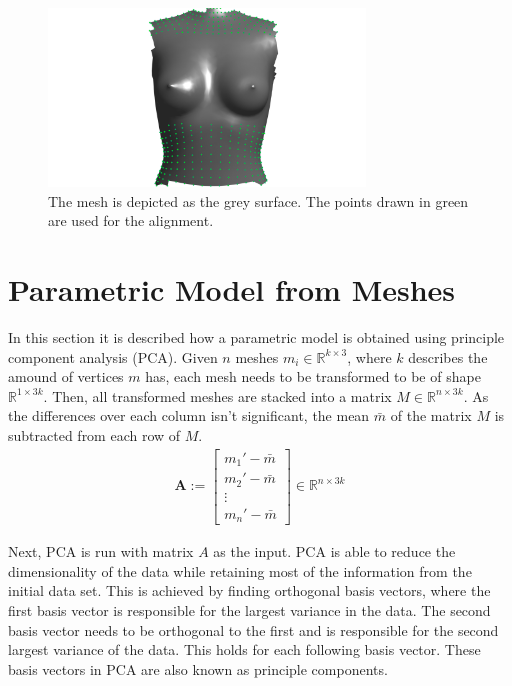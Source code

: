 \begin{figure}[h]
\centering
\includegraphics[width=0.75\textwidth]{figures/alignment}
\caption[Alignment points visualized]{The mesh is depicted as the grey surface. The points drawn in green are used for the alignment.}
\label{fig:alignment}
\end{figure}

\section{Parametric Model from Meshes}
\label{paramModel}
In this section it is described how a parametric model is obtained using principle component analysis (PCA). Given $n$ meshes $m_i \in \mathbb{R}^{k \times 3}$, where $k$ describes the amound of vertices $m$ has, each mesh needs to be transformed to be of shape $\mathbb{R}^{1 \times 3k}$. Then, all transformed meshes are stacked into a matrix $M \in \mathbb{R}^{n \times 3k}$. As the differences over each column isn't significant, the mean $\bar{m}$ of the matrix $M$ is subtracted from each row of $M$.
\begin{gather}
\mathbf{A} :=
\begin{bmatrix}
 m_1' - \bar{m} \\
 m_2' - \bar{m} \\
 \vdots \\
 m_n' - \bar{m}
\end{bmatrix}
\in \mathbb{R}^{n \times 3k}
\end{gather}

Next, PCA is run with matrix $A$ as the input. PCA is able to reduce the dimensionality of the data while retaining most of the information from the initial data set. This is achieved by finding orthogonal basis vectors, where the first basis vector is responsible for the largest variance in the data. The second basis vector needs to be orthogonal to the first and is responsible for the second largest variance of the data. This holds for each following basis vector. These basis vectors in PCA are also known as principle components.

